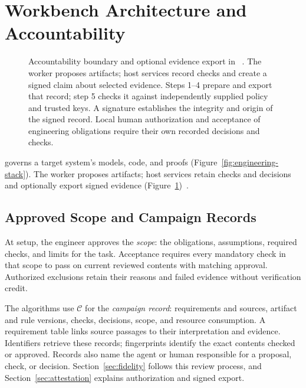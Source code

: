 \section{Workbench Architecture and Accountability}
\label{sec:architecture}

\begin{figure}[t]
\centering

\caption{Accountability boundary and optional evidence export in \workbench{}~\cite{scpCheckpoint,intotoStatement,dsse}. The worker proposes artifacts; host services record checks and create a signed claim about selected evidence. Steps 1--4 prepare and export that record; step 5 checks it against independently supplied policy and trusted keys. A signature establishes the integrity and origin of the signed record. Local human authorization and acceptance of engineering obligations require their own recorded decisions and checks.}
\label{fig:attestation}
\end{figure}

\workbench{} governs a target system's models, code, and proofs (Figure~\ref{fig:engineering-stack}). The worker proposes artifacts; host services retain checks and decisions and optionally export signed evidence (Figure~\ref{fig:attestation})~\cite{scpCheckpoint}.

\subsection{Approved Scope and Campaign Records}
At setup, the engineer approves the \emph{scope}: the obligations, assumptions, required checks, and limits for the task. Acceptance requires every mandatory check in that scope to pass on current reviewed contents with matching approval. Authorized exclusions retain their reasons and failed evidence without verification credit.

The algorithms use $\mathcal{C}$ for the \emph{campaign record}: requirements and sources, artifact and rule versions, checks, decisions, scope, and resource consumption. A requirement table links source passages to their interpretation and evidence. Identifiers retrieve these records; fingerprints identify the exact contents checked or approved. Records also name the agent or human responsible for a proposal, check, or decision. Section~\ref{sec:fidelity} follows this review process, and Section~\ref{sec:attestation} explains authorization and signed export.

